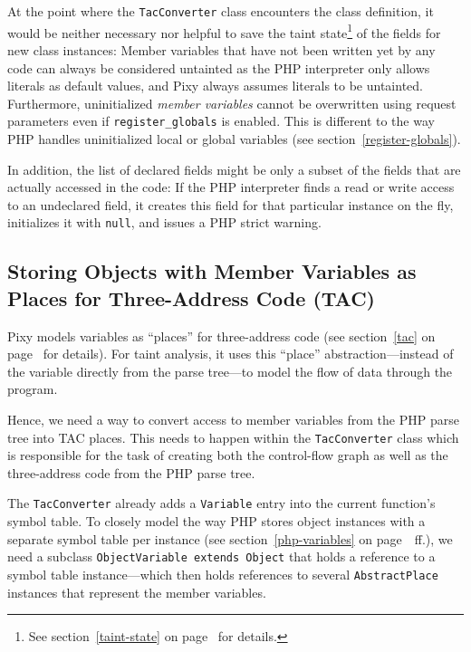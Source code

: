 At the point where the \texttt{TacConverter} class encounters the class definition, it would be neither necessary nor helpful to save the taint state\footnote{See section~\ref{taint-state} on page~\pageref{taint-state} for details.}\label{fields-not-saved-on-new} of the fields for new class instances: Member variables that have not been written yet by any code can always be considered untainted as the PHP interpreter only allows literals as default values, and Pixy always assumes literals to be untainted. Furthermore, uninitialized \emph{member variables} cannot be overwritten using request parameters even if \texttt{register\_globals} is enabled. This is different to the way PHP handles uninitialized local or global variables (see section~\ref{register-globals}).

In addition, the list of declared fields might be only a subset of the fields that are actually accessed in the code: If the PHP interpreter finds a read or write access to an undeclared field, it creates this field for that particular instance on the fly, initializes it with \texttt{null}, and issues a PHP strict warning.



\subsection{Storing Objects with Member Variables as Places for Three-Address Code (TAC)}

Pixy models variables as ``places'' for three-address code (see section~\ref{tac} on page~\pageref{tac} for details). For taint analysis, it uses this ``place'' abstraction---instead of the variable directly from the parse tree---to model the flow of data through the program.

Hence, we need a way to convert access to member variables from the PHP parse tree into TAC places. This needs to happen within the \texttt{TacConverter} class which is responsible for the task of creating both the control-flow graph as well as the three-address code from the PHP parse tree.

The \texttt{TacConverter} already adds a \texttt{Variable} entry into the current function's symbol table. To closely model the way PHP stores object instances with a separate symbol table per instance (see section~\ref{php-variables} on page~\pageref{php-variables}~ff.), we need a subclass \texttt{ObjectVariable extends Object} that holds a reference to a symbol table instance---which then holds references to several \texttt{AbstractPlace} instances that represent the member variables.


